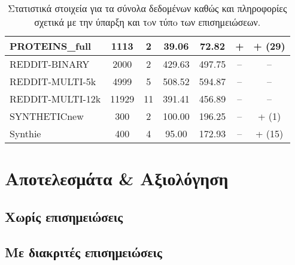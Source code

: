 \begin{table}[]
\begin{adjustbox}{angle=90}
{{\begin{tabularx}{0.861\textheight}{|l|c|c|c|c|c|c|}
PROTEINS\_full                & 1113           & 2               & 39.06                & 72.82                & +           & + (29)                            \\ \hline
REDDIT-BINARY                 & 2000           & 2               & 429.63               & 497.75               & –           & –                                 \\ \hline
REDDIT-MULTI-5k               & 4999           & 5               & 508.52               & 594.87               & –           & –                                 \\ \hline
REDDIT-MULTI-12k              & 11929          & 11              & 391.41               & 456.89               & –           & –                                 \\ \hline
SYNTHETICnew                  & 300            & 2               & 100.00               & 196.25               & –           & + (1)                             \\ \hline
Synthie                       & 400            & 4               & 95.00                & 172.93               & –           & + (15)                            \\ \hline
\end{tabularx}
}
}
\end{adjustbox}
\caption{Στατιστικά στοιχεία για τα σύνολα δεδομένων καθώς και πληροφορίες σχετικά με την ύπαρξη και τoν τύπo των επισημειώσεων.}
\label{ref:dataset_statistics}
\end{table}
\section{Αποτελεσμάτα \& Αξιολόγηση}
\subsection{Χωρίς επισημειώσεις}
\subsection{Με διακριτές επισημειώσεις}
